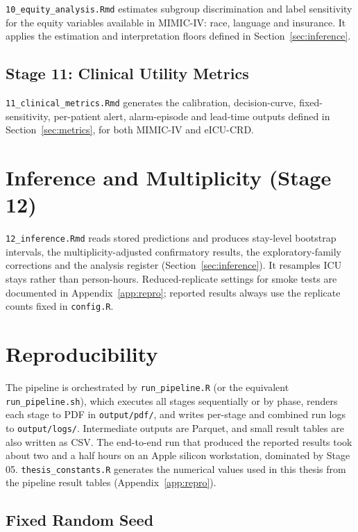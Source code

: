 \texttt{10\_equity\_analysis.Rmd} estimates subgroup discrimination and label
sensitivity for the equity variables available in MIMIC-IV: race, language and
insurance. It applies the estimation and interpretation floors defined in
Section~\ref{sec:inference}.

\subsection{Stage 11: Clinical Utility Metrics}

\texttt{11\_clinical\_metrics.Rmd} generates the calibration, decision-curve,
fixed-sensitivity, per-patient alert, alarm-episode and lead-time outputs
defined in Section~\ref{sec:metrics}, for both MIMIC-IV and eICU-CRD.


\section{Inference and Multiplicity (Stage 12)}

\texttt{12\_inference.Rmd} reads stored predictions and produces stay-level
bootstrap intervals, the multiplicity-adjusted confirmatory results, the
exploratory-family corrections and the analysis register
(Section~\ref{sec:inference}). It resamples ICU stays rather than
person-hours. Reduced-replicate settings for smoke tests are documented in
Appendix~\ref{app:repro}; reported results always use the replicate counts
fixed in \texttt{config.R}.


\section{Reproducibility}

The pipeline is orchestrated by \texttt{run\_\allowbreak pipeline.R} (or the
equivalent \texttt{run\_\allowbreak pipeline.sh}), which executes all stages
sequentially or by phase, renders each stage to PDF in \texttt{output/pdf/},
and writes per-stage and combined run logs to \texttt{output/logs/}.
Intermediate outputs are Parquet, and small result tables are also written as
CSV. The end-to-end run that produced the reported results took about two and
a half hours on an Apple silicon workstation, dominated by Stage 05.
\texttt{thesis\_constants.R} generates the numerical values used in this thesis
from the pipeline result tables (Appendix~\ref{app:repro}).

\subsection{Fixed Random Seed}

